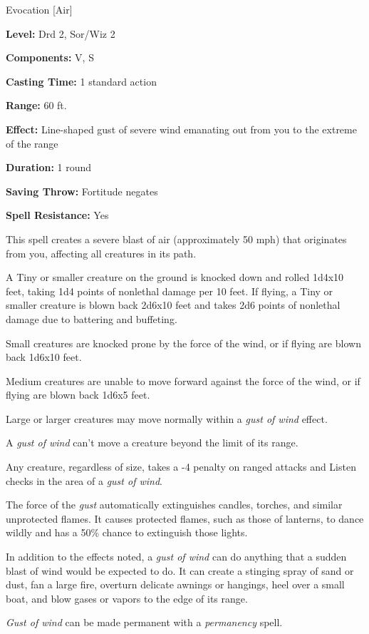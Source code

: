 
Evocation [Air]

\textbf{Level:} Drd 2, Sor/Wiz 2

\textbf{Components:} V, S

\textbf{Casting Time:} 1 standard action

\textbf{Range:} 60 ft.

\textbf{Effect:} Line-shaped gust of severe wind emanating out from you to the 
extreme of the range

\textbf{Duration:} 1 round

\textbf{Saving Throw:} Fortitude negates

\textbf{Spell Resistance:} Yes

This spell creates a severe blast of air (approximately 50 mph) that originates 
from you, affecting all creatures in its path.

A Tiny or smaller creature on the ground is knocked down and rolled 1d4x10 feet, 
taking 1d4 points of nonlethal damage per 10 feet. If flying, a Tiny or smaller 
creature is blown back 2d6x10 feet and takes 2d6 points of nonlethal damage due 
to battering and buffeting.

Small creatures are knocked prone by the force of the wind, or if flying are blown 
back 1d6x10 feet.

Medium creatures are unable to move forward against the force of the wind, or if 
flying are blown back 1d6x5 feet.

Large or larger creatures may move normally within a \textit{gust of wind} effect.

A \textit{gust of wind} can't move a creature beyond the limit of its range.

Any creature, regardless of size, takes a -4 penalty on ranged attacks and Listen 
checks in the area of a \textit{gust of wind}.

The force of the \textit{gust} automatically extinguishes candles, torches, and 
similar unprotected flames. It causes protected flames, such as those of lanterns, 
to dance wildly and has a 50\% chance to extinguish those lights.

In addition to the effects noted, a \textit{gust of wind} can do anything that 
a sudden blast of wind would be expected to do. It can create a stinging spray 
of sand or dust, fan a large fire, overturn delicate awnings or hangings, heel 
over a small boat, and blow gases or vapors to the edge of its range.

\textit{Gust of wind} can be made permanent with a \textit{permanency} spell.




